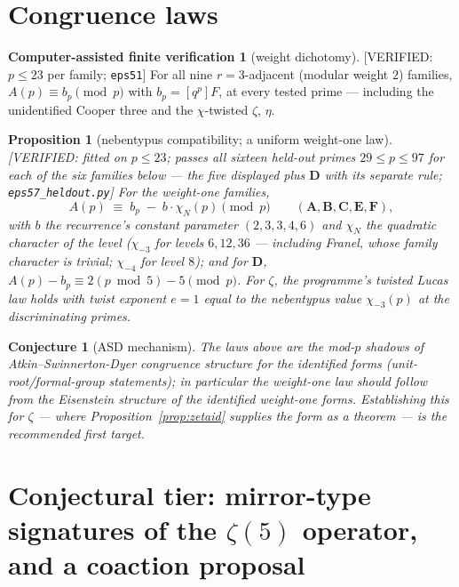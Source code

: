 \documentclass[11pt,reqno]{amsart}
\theoremstyle{plain}
\newtheorem{proposition}[theorem]{Proposition}
\newtheorem{conjecture}[theorem]{Conjecture}
\theoremstyle{definition}
\newtheorem{verification}[theorem]{Computer-assisted finite verification}
\theoremstyle{remark}
\newcommand{\VerifiedR}[1]{\textup{\textsf{[VERIFIED: #1]}}}
\begin{document}
\section{Congruence laws}\label{sec:cong}

\begin{verification}[weight dichotomy]\label{ver:asd}
\VerifiedR{$p\le23$ per family; \texttt{eps51}}\quad
For all nine $r=3$-adjacent (modular weight $2$) families,
$A(p)\equiv b_p\pmod p$ with $b_p=[q^p]F$, at every tested prime ---
including the unidentified Cooper three and the $\chi$-twisted $\zeta$,
$\eta$.
\end{verification}

\begin{proposition}[nebentypus compatibility; a uniform weight-one law]
\label{prop:wt1}
\VerifiedR{fitted on $p\le23$; \emph{passes all sixteen held-out primes}
$29\le p\le97$ for each of the six families below --- the five displayed
plus $\mathbf D$ with its separate rule; \texttt{eps57\_heldout.py}}\quad
For the weight-one families,
\[
A(p)\;\equiv\;b_p\;-\;b\cdot\chi_N(p)\pmod p
\qquad(\mathbf A,\mathbf B,\mathbf C,\mathbf E,\mathbf F),
\]
with $b$ the recurrence's constant parameter $(2,3,3,4,6)$ and $\chi_N$
the quadratic character of the \emph{level} ($\chi_{-3}$ for levels
$6,12,36$ --- including Franel, whose family character is trivial;
$\chi_{-4}$ for level $8$); and for $\mathbf D$,
$A(p)-b_p\equiv2(p\bmod5)-5\pmod p$. For $\zeta$, the programme's twisted
Lucas law holds with twist exponent $e=1$ equal to the nebentypus value
$\chi_{-3}(p)$ at the discriminating primes.
\end{proposition}

\begin{conjecture}[ASD mechanism]\label{conj:asd}
The laws above are the mod-$p$ shadows of Atkin--Swinnerton-Dyer
congruence structure for the identified forms (unit-root/formal-group
statements); in particular the weight-one law should follow from the
Eisenstein structure of the identified weight-one forms. Establishing
this for $\zeta$ --- where Proposition~\ref{prop:zetaid} supplies the
form as a theorem --- is the recommended first target.
\end{conjecture}

\section{Conjectural tier: mirror-type signatures of the $\zeta(5)$
operator, and a coaction proposal}\label{sec:mirror}
\end{document}

